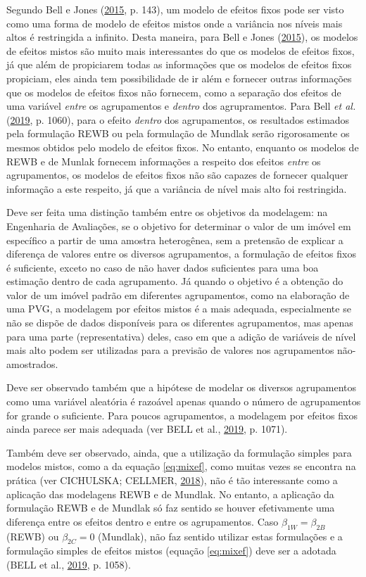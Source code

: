 \documentclass[
  a4paper, 11pt]{article}
\begin{document}
Segundo Bell e Jones (\protect\hyperlink{ref-bell2015}{2015}, p. 143),
um modelo de efeitos fixos pode ser visto como uma forma de modelo de
efeitos mistos onde a variância nos níveis mais altos é restringida a
infinito. Desta maneira, para Bell e Jones
(\protect\hyperlink{ref-bell2015}{2015}), os modelos de efeitos mistos
são muito mais interessantes do que os modelos de efeitos fixos, já que
além de propiciarem todas as informações que os modelos de efeitos fixos
propiciam, eles ainda tem possibilidade de ir além e fornecer outras
informações que os modelos de efeitos fixos não fornecem, como a
separação dos efeitos de uma variável \emph{entre} os agrupamentos e
\emph{dentro} dos agrupramentos. Para Bell \emph{et al.}
(\protect\hyperlink{ref-bell2019}{2019}, p. 1060), para o efeito
\emph{dentro} dos agrupamentos, os resultados estimados pela formulação
REWB ou pela formulação de Mundlak serão rigorosamente os mesmos obtidos
pelo modelo de efeitos fixos. No entanto, enquanto os modelos de REWB e
de Munlak fornecem informações a respeito dos efeitos \emph{entre} os
agrupamentos, os modelos de efeitos fixos não são capazes de fornecer
qualquer informação a este respeito, já que a variância de nível mais
alto foi restringida.

Deve ser feita uma distinção também entre os objetivos da modelagem: na
Engenharia de Avaliações, se o objetivo for determinar o valor de um
imóvel em específico a partir de uma amostra heterogênea, sem a
pretensão de explicar a diferença de valores entre os diversos
agrupamentos, a formulação de efeitos fixos é suficiente, exceto no caso
de não haver dados suficientes para uma boa estimação dentro de cada
agrupamento. Já quando o objetivo é a obtenção do valor de um imóvel
padrão em diferentes agrupamentos, como na elaboração de uma PVG, a
modelagem por efeitos mistos é a mais adequada, especialmente se não se
dispõe de dados disponíveis para os diferentes agrupamentos, mas apenas
para uma parte (representativa) deles, caso em que a adição de variáveis
de nível mais alto podem ser utilizadas para a previsão de valores nos
agrupamentos não-amostrados.

Deve ser observado também que a hipótese de modelar os diversos
agrupamentos como uma variável aleatória é razoável apenas quando o
número de agrupamentos for grande o suficiente. Para poucos
agrupamentos, a modelagem por efeitos fixos ainda parece ser mais
adequada (ver BELL et al., \protect\hyperlink{ref-bell2019}{2019}, p.
1071).

Também deve ser observado, ainda, que a utilização da formulação simples
para modelos mistos, como a da equação \ref{eq:mixef}, como muitas vezes
se encontra na prática (ver CICHULSKA; CELLMER,
\protect\hyperlink{ref-polonia}{2018}), não é tão interessante como a
aplicação das modelagens REWB e de Mundlak. No entanto, a aplicação da
formulação REWB e de Mundlak só faz sentido se houver efetivamente uma
diferença entre os efeitos dentro e entre os agrupamentos. Caso
\(\beta_{1W} = \beta_{2B}\) (REWB) ou \(\beta_{2C} = 0\) (Mundlak), não
faz sentido utilizar estas formulações e a formulação simples de efeitos
mistos (equação \ref{eq:mixef}) deve ser a adotada (BELL et al.,
\protect\hyperlink{ref-bell2019}{2019}, p. 1058).
\end{document}
